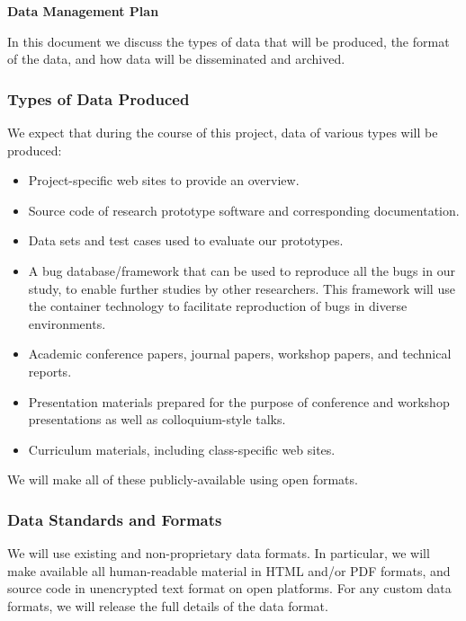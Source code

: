 \documentclass{article}
\begin{document}
\begin{center}
\Large
\bfseries
Data Management Plan
\end{center}

\vspace{1em}

In this document we discuss the types of data that will be produced, the format of the data, and how data will be disseminated and archived.

\subsubsection*{Types of Data Produced}

We expect that during the course of this project, data of various types will be
produced:

\begin{itemize}
\item Project-specific web sites to provide an overview.

\item Source code of research prototype software and corresponding
  documentation.

\item Data sets and test cases used to evaluate our prototypes.

\item A bug database/framework that can be used to reproduce all the bugs in our study, to enable further studies by other researchers. This framework will use the container technology to facilitate reproduction of bugs in diverse environments.

\item Academic conference papers, journal papers, workshop papers, and technical reports.

\item Presentation materials prepared for the purpose of conference and workshop presentations as well as colloquium-style talks.

\item Curriculum materials, including class-specific web sites.
\end{itemize}

We will make all of these publicly-available using open formats.

\subsubsection*{Data Standards and Formats}

We will use existing and non-proprietary data formats. In
particular, we will make available all human-readable material in HTML and/or
PDF formats, and source code in unencrypted text format on open platforms. For
any custom data formats, we will release the full details of the data
format.
\end{document}
